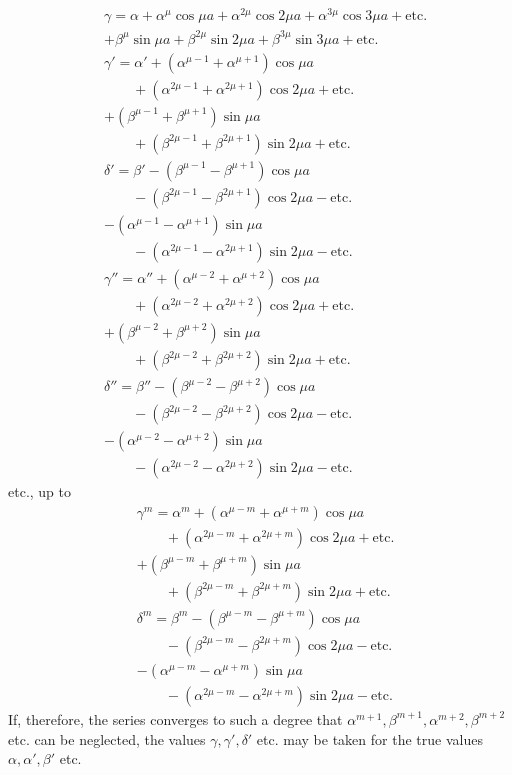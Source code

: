 \[
\begin{aligned}
&\gamma=\alpha+\alpha^{\mu}\cos\mu a+\alpha^{2\mu}\cos2\mu a+\alpha^{3\mu}\cos3\mu a+\mathrm{etc.}\\[5pt]
&+\beta^{\mu}\sin\mu a+\beta^{2\mu}\sin2\mu a+\beta^{3\mu}\sin3\mu a+\mathrm{etc.}\\[5pt]
&\gamma'=\alpha'+(\alpha^{\mu-1}+\alpha^{\mu+1})\cos\mu a\\[5pt]&\qquad{}+(\alpha^{2\mu-1}+\alpha^{2\mu+1})\cos2\mu a+\mathrm{etc.}\\[5pt]
&+(\beta^{\mu-1}+\beta^{\mu+1})\sin\mu a\\[5pt]&\qquad{}+(\beta^{2\mu-1}+\beta^{2\mu+1})\sin2\mu a+\mathrm{etc.}\\[5pt]
&\delta'=\beta'-(\beta^{\mu-1}-\beta^{\mu+1})\cos\mu a\\[5pt]&\qquad{}-(\beta^{2\mu-1}-\beta^{2\mu+1})\cos2\mu a-\mathrm{etc.}\\[5pt]
&-(\alpha^{\mu-1}-\alpha^{\mu+1})\sin\mu a\\[5pt]&\qquad{}-(\alpha^{2\mu-1}-\alpha^{2\mu+1})\sin2\mu a-\mathrm{etc.}\\[5pt]
&\gamma''=\alpha''+(\alpha^{\mu-2}+\alpha^{\mu+2})\cos\mu a\\[5pt]&\qquad{}+(\alpha^{2\mu-2}+\alpha^{2\mu+2})\cos2\mu a+\mathrm{etc.}\\[5pt]
&+(\beta^{\mu-2}+\beta^{\mu+2})\sin\mu a\\[5pt]&\qquad{}+(\beta^{2\mu-2}+\beta^{2\mu+2})\sin2\mu a+\mathrm{etc.}\\[5pt]
&\delta''=\beta''-(\beta^{\mu-2}-\beta^{\mu+2})\cos\mu a\\[5pt]&\qquad{}-(\beta^{2\mu-2}-\beta^{2\mu+2})\cos2\mu a-\mathrm{etc.}\\[5pt]
&-(\alpha^{\mu-2}-\alpha^{\mu+2})\sin\mu a\\[5pt]&\qquad{}-(\alpha^{2\mu-2}-\alpha^{2\mu+2})\sin2\mu a-\mathrm{etc.}
\end{aligned}
\]
etc., up to
\[
\begin{aligned}
&\gamma^m=\alpha^m+(\alpha^{\mu-m}+\alpha^{\mu+m})\cos\mu a\\[5pt]&\qquad{}+(\alpha^{2\mu-m}+\alpha^{2\mu+m})\cos2\mu a+\mathrm{etc.}\\[5pt]
&+(\beta^{\mu-m}+\beta^{\mu+m})\sin\mu a\\[5pt]&\qquad{}+(\beta^{2\mu-m}+\beta^{2\mu+m})\sin2\mu a+\mathrm{etc.}\\[5pt]
&\delta^m=\beta^m-(\beta^{\mu-m}-\beta^{\mu+m})\cos\mu a\\[5pt]&\qquad{}-(\beta^{2\mu-m}-\beta^{2\mu+m})\cos2\mu a-\mathrm{etc.}\\[5pt]
&-(\alpha^{\mu-m}-\alpha^{\mu+m})\sin\mu a\\[5pt]&\qquad{}-(\alpha^{2\mu-m}-\alpha^{2\mu+m})\sin2\mu a-\mathrm{etc.}
\end{aligned}
\]
If, therefore, the series converges to such a degree that \hfill\break\(\alpha^{m+1},\beta^{m+1},\alpha^{m+2},\beta^{m+2}\) etc. can be
neglected, the values \(\gamma,\gamma',\delta'\) etc. may be taken for the true values \(\alpha,\alpha',\beta'\) etc.
\endgroup
